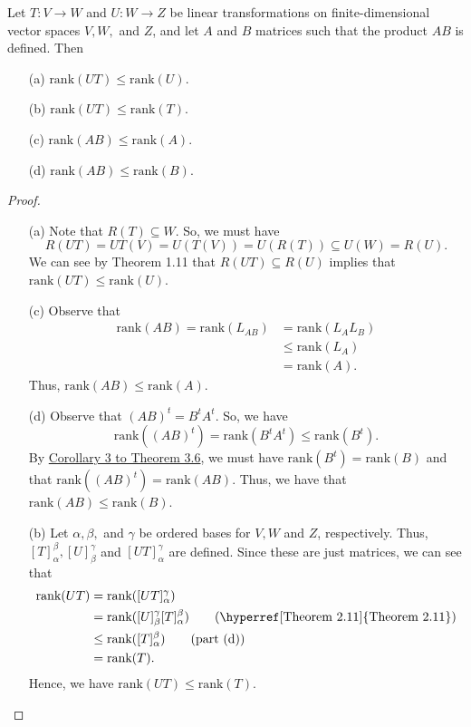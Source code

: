 \begin{theorem}
    Let \( T: V \to W  \) and \( U: W \to Z  \) be linear transformations on finite-dimensional vector spaces \( V,W,  \) and \( Z  \), and let \( A  \) and \( B  \) matrices such that the product \( AB  \) is defined. Then
    \begin{enumerate}
        \item[(a)] \( \text{rank}(UT) \leq \text{rank}(U) \).
        \item[(b)] \( \text{rank}(UT) \leq \text{rank}(T) \).
        \item[(c)] \( \text{rank}(AB) \leq \text{rank}(A) \).
        \item[(d)] \( \text{rank}(AB) \leq \text{rank}(B) \).
    \end{enumerate}
\end{theorem}
\begin{proof}
\begin{enumerate}
    \item[(a)] Note that \( R(T) \subseteq W  \). So, we must have
        \[  R(UT) = UT(V) = U(T(V)) = U(R(T)) \subseteq U(W) = R(U). \]
        We can see by Theorem 1.11 that \( R(UT) \subseteq R(U)  \) implies that  \( \text{rank}(UT) \leq \text{rank}(U) \).
    \item[(c)] Observe that
        \begin{align*}
            \text{rank}(AB) = \text{rank}({L}_{AB}) &= \text{rank}({L}_{A} {L}_{B}) \\
                                                    &\leq  \text{rank}({L}_{A}) \tag{By part (a)} \\
                                                    &= \text{rank}(A).
        \end{align*}
        Thus, \( \text{rank}(AB) \leq \text{rank}(A) \).
    \item[(d)] Observe that \( (AB)^{t} = B^{t} A^{t} \). So, we have
        \[  \text{rank}((AB)^{t}) = \text{rank}(B^{t} A^{t}) \leq \text{rank}(B^{t}). \]
By {\hyperref[Corollary 3 to Theorem 3.6]{Corollary 3 to Theorem 3.6}}, we must have \( \text{rank}(B^{t}) = \text{rank}(B) \) and that \( \text{rank}((AB)^{t}) = \text{rank}(AB) \). Thus, we have that \( \text{rank}(AB) \leq \text{rank}(B) \).
    \item[(b)] Let \( \alpha, \beta,  \) and \( \gamma \) be ordered bases for \( V, W  \) and \( Z  \), respectively. Thus, \( [T]_{\alpha}^{\beta}, [U]_{\beta}^{\gamma} \) and \( [UT]_{\alpha}^{\gamma}   \) are defined. Since these are just matrices, we can see that
        \begin{align*}
            \text{rank}(UT) &= \text{rank}([UT]_{\alpha}^{\gamma} ) \\
                            &= \text{rank}([U]_{\beta}^{\gamma}  [T]_{\alpha}^{\beta} ) \tag{{\hyperref[Theorem 2.11]{Theorem 2.11}}} \\
                            &\leq \text{rank}([T]_{\alpha}^{\beta}) \tag{part (d)} \\
                            &= \text{rank}(T).
        \end{align*}
        Hence, we have \( \text{rank}(UT) \leq \text{rank}(T) \).
\end{enumerate}
\end{proof}
